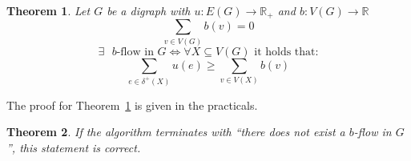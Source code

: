 \documentclass{article}
\newtheorem{theorem}{Theorem}
\begin{document}
\begin{theorem}\label{lemma-5.10}
  Let $G$ be a digraph with $u: E(G) \rightarrow \mathbb{R}_+$ and $b: V(G) \rightarrow \mathbb{R}$
  \[ \sum_{v \in V(G)} b(v) = 0 \]
  \begin{equation*}
    \exists \text{ $b$-flow in } G \Leftrightarrow \forall X \subseteq V(G) \text{ it holds that:}
  \end{equation*} \begin{equation*}
    \sum_{e \in \delta^+(X)} u(e) \geq \sum_{v \in V(X)} b(v)
  \end{equation*}
\end{theorem}

The proof for Theorem~\ref{lemma-5.10} is given in the practicals.

\begin{theorem}\label{proposition-5.9}
  If the algorithm terminates with ``there does not exist a $b$-flow in $G$'',
  this statement is correct.
\end{theorem}
\end{document}
